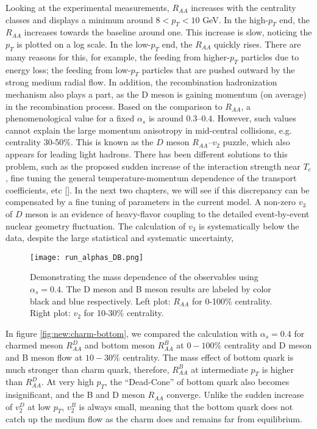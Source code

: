 Looking at the experimental measurements, $R_{AA}$ increases with the centrality classes and displays a minimum around $8 < p_T < 10$ GeV.
In the high-$p_T$ end, the $R_{AA}$ increases towards the baseline around one. 
This increase is slow, noticing the $p_T$ is plotted on a log scale.
In the low-$p_T$ end, the $R_{AA}$ quickly rises.
There are many reasons for this, for example, the feeding from higher-$p_T$ particles due to energy loss;  the feeding from low-$p_T$ particles that are pushed outward by the strong medium radial flow.
In addition, the recombination hadronization mechanism also plays a part, as the D meson is gaining momentum (on average) in the recombination process.
Based on the comparison to $R_{AA}$, a phenomenological value for a fixed $\alpha_s$ is around $0.3$--$0.4$.
However, such values cannot explain the large momentum anisotropy in mid-central collisions, e.g. centrality 30-50\%.
This is known as the $D$ meson $R_{AA}$--$v_2$ puzzle, which also appears for leading light hadrons.
There has been different solutions to this problem, such as the proposed sudden increase of the interaction strength near $T_c$, fine tuning the general temperature-momentum dependence of the transport coefficients, etc [].
In the next two chapters, we will see if this discrepancy can be compensated by a fine tuning of parameters in the current model.
A non-zero $v_3$ of $D$ meson is an evidence of heavy-flavor coupling to the detailed event-by-event nuclear geometry fluctuation.
The calculation of $v_3$ is systematically below the data, despite the large statistical and systematic uncertainty,

\begin{figure}
\centering
\texttt{[image: run\_alphas\_DB.png]}
\caption{Demonstrating the mass dependence of the observables using $\alpha_s = 0.4$. 
The D meson and B meson results are labeled by color black and blue respectively.
Left plot: $R_{AA}$ for 0-100\% centrality. Right plot: $v_2$ for 10-30\% centrality.}
\label{fig:new:fix-DB}
\end{figure}

In figure \ref{fig:new:charm-bottom}, we compared the calculation with $\alpha_s = 0.4$ for charmed meson $R_{AA}^D$ and bottom meson $R_{AA}^B$ at $0-100\%$ centrality and D meson and B meson flow at $10-30\%$ centrality.
The mass effect of bottom quark is much stronger than charm quark, therefore, $R_{AA}^B$ at intermediate $p_T$ is higher than $R_{AA}^D$. 
At very high $p_T$, the ``Dead-Cone'' of bottom quark also becomes insignificant, and the B and D meson $R_{AA}$ converge.
Unlike the sudden increase of $v_2^D$ at low $p_T$, $v_2^B$ is always small, meaning that the bottom quark does not catch up the medium flow as the charm does and remains far from equilibrium.

